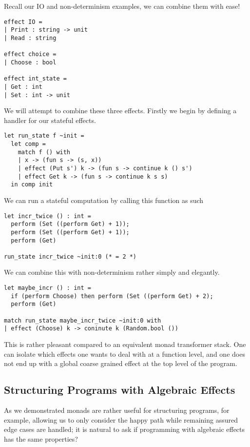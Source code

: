 \begin{example}
    Recall our IO and non-determinism examples,
    we can combine them with ease!
\begin{verbatim}
effect IO =
| Print : string -> unit
| Read : string

effect choice =
| Choose : bool

effect int_state =
| Get : int
| Set : int -> unit
\end{verbatim}
    We will attempt to combine these three effects.
    Firstly we begin by defining a handler for
    our stateful effects.
\begin{verbatim}
let run_state f ~init =
  let comp =
    match f () with
    | x -> (fun s -> (s, x))
    | effect (Put s') k -> (fun s -> continue k () s')
    | effect Get k -> (fun s -> continue k s s)
  in comp init
\end{verbatim}
We can run a stateful computation by calling this function as such
\begin{verbatim}
let incr_twice () : int =
  perform (Set ((perform Get) + 1));
  perform (Set ((perform Get) + 1));
  perform (Get)

run_state incr_twice ~init:0 (* = 2 *)
\end{verbatim}
We can combine this with non-determinism
rather simply and elegantly.
\begin{verbatim}
let maybe_incr () : int =
  if (perform Choose) then perform (Set ((perform Get) + 2);
  perform (Get)

match run_state maybe_incr_twice ~init:0 with
| effect (Choose) k -> coninute k (Random.bool ())
\end{verbatim}
\end{example}

This is rather pleasant compared to
an equivalent monad transformer stack.
One can isolate which effects one wants to
deal with at a function level,
and one does not end up with a global
coarse grained effect at the top level
of the program.

\subsection{Structuring Programs with Algebraic Effects}
As we demonstrated monads are rather useful for structuring programs,
for example,
allowing us to only consider the happy path while remaining assured
edge cases are handled;
it is natural to ask if programming with algebraic effects
has the same properties?

